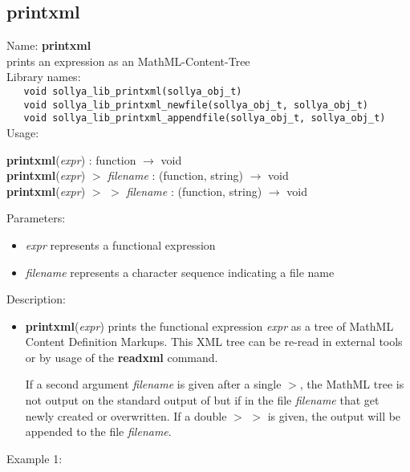 \subsection{printxml}
\label{labprintxml}
\noindent Name: \textbf{printxml}\\
\phantom{aaa}prints an expression as an MathML-Content-Tree\\[0.2cm]
\noindent Library names:\\
\verb|   void sollya_lib_printxml(sollya_obj_t)|\\
\verb|   void sollya_lib_printxml_newfile(sollya_obj_t, sollya_obj_t)|\\
\verb|   void sollya_lib_printxml_appendfile(sollya_obj_t, sollya_obj_t)|\\[0.2cm]
\noindent Usage: 
\begin{center}
\textbf{printxml}(\emph{expr}) : \textsf{function} $\rightarrow$ \textsf{void}\\
\textbf{printxml}(\emph{expr}) $>$ \emph{filename} : (\textsf{function}, \textsf{string}) $\rightarrow$ \textsf{void}\\
\textbf{printxml}(\emph{expr}) $>$ $>$ \emph{filename} : (\textsf{function}, \textsf{string}) $\rightarrow$ \textsf{void}\\
\end{center}
Parameters: 
\begin{itemize}
\item \emph{expr} represents a functional expression
\item \emph{filename} represents a character sequence indicating a file name
\end{itemize}
\noindent Description: \begin{itemize}

\item \textbf{printxml}(\emph{expr}) prints the functional expression \emph{expr} as a tree of
   MathML Content Definition Markups. This XML tree can be re-read in
   external tools or by usage of the \textbf{readxml} command.
    
   If a second argument \emph{filename} is given after a single $>$, the
   MathML tree is not output on the standard output of \sollya but if in
   the file \emph{filename} that get newly created or overwritten. If a double
   $>$ $>$ is given, the output will be appended to the file \emph{filename}.
\end{itemize}
\noindent Example 1: 
